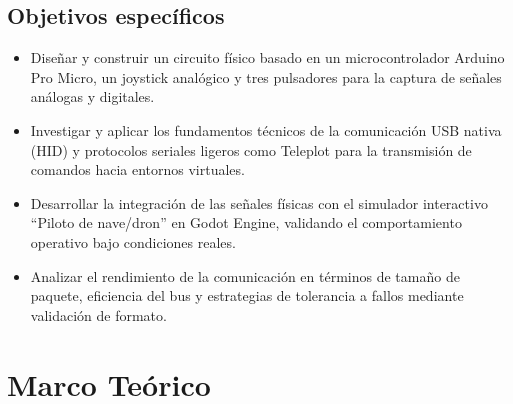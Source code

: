 \documentclass[journal]{IEEEtran}
\begin{document}
\subsection{Objetivos específicos}
\begin{itemize}
    \item Diseñar y construir un circuito físico basado en un microcontrolador Arduino Pro Micro, un joystick analógico y tres pulsadores para la captura de señales análogas y digitales.
    \item Investigar y aplicar los fundamentos técnicos de la comunicación USB nativa (HID) y protocolos seriales ligeros como Teleplot para la transmisión de comandos hacia entornos virtuales.
    \item Desarrollar la integración de las señales físicas con el simulador interactivo “Piloto de nave/dron” en Godot Engine, validando el comportamiento operativo bajo condiciones reales.
    \item Analizar el rendimiento de la comunicación en términos de tamaño de paquete, eficiencia del bus y estrategias de tolerancia a fallos mediante validación de formato.
\end{itemize}






\section{Marco Teórico}
\end{document}
